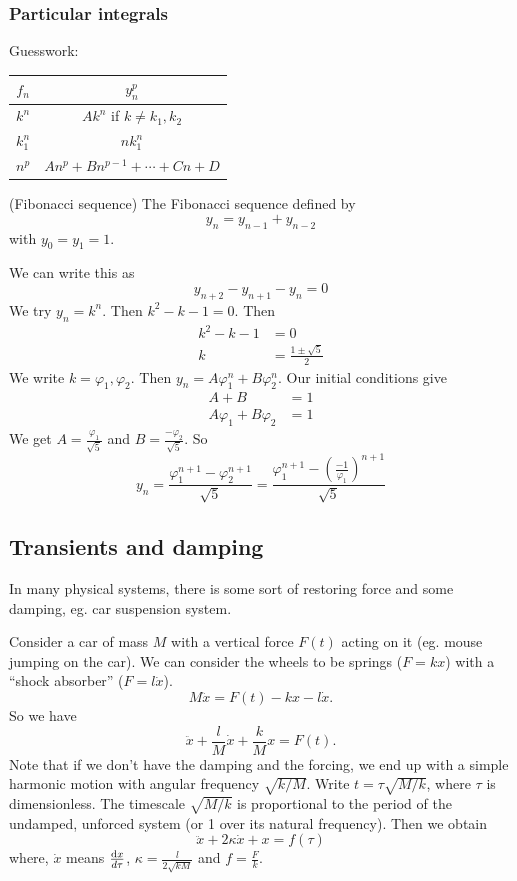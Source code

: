 \documentclass[a4paper]{article}
\begin{document}
  \subsubsection{Particular integrals}
  Guesswork:

  \vspace{4pt}
  \noindent\begin{tabular}{cc}
    \toprule
    $f_n$ & $y_n^p$\\
    \midrule
    $k^n$ & $Ak^n$ if $k \not= k_1, k_2$\\
    $k_1^n$ & $nk_1^n$\\
    $n^p$ & $An^p + Bn^{p - 1} + \cdots + Cn + D$\\
    \bottomrule
  \end{tabular}

  \begin{eg}
    (Fibonacci sequence) The Fibonacci sequence defined by
    \[
      y_n = y_{n - 1} + y_{n - 2}
    \]
    with $y_0 = y_1 = 1$.

    We can write this as
    \[
      y_{n + 2} - y_{n + 1} - y_n = 0
    \]
    We try $y_n = k^n$. Then $k^2 - k - 1 = 0$. Then
    \begin{align*}
      k^2 - k - 1 &= 0\\
      k &= \frac{1 \pm \sqrt{5}}{2}
    \end{align*}
    We write $k = \varphi_1, \varphi_2$. Then $y_n = A\varphi_1^n + B\varphi_2^n$. Our initial conditions give
    \begin{align*}
      A + B &= 1\\
      A\varphi_1 + B\varphi_2 &= 1
    \end{align*}
    We get $\displaystyle A = \frac{\varphi_1}{\sqrt{5}}$ and $\displaystyle B = \frac{-\varphi_2}{\sqrt{5}}$. So
    \[
      y_n = \frac{\varphi_1^{n + 1} - \varphi_2^{n + 1}}{\sqrt{5}} = \frac{\varphi_1^{n + 1} - \left(\frac{-1}{\varphi_1}\right)^{n + 1}}{\sqrt{5}}
    \]
  \end{eg}

  \subsection{Transients and damping}
  In many physical systems, there is some sort of restoring force and some damping, eg. car suspension system.

  Consider a car of mass $M$ with a vertical force $F(t)$ acting on it (eg. mouse jumping on the car). We can consider the wheels to be springs ($F = kx$) with a ``shock absorber'' ($F = l\dot x$).
  \[
    M\ddot x = F(t) - kx - l\dot x.
  \]
  So we have
  \[
    \ddot x + \frac{l}{M}\dot x + \frac{k}{M}x = F(t).
  \]
  Note that if we don't have the damping and the forcing, we end up with a simple harmonic motion with angular frequency $\sqrt{k/M}$. Write $t = \tau \sqrt{M/k}$, where $\tau$ is dimensionless. The timescale $\sqrt{M/k}$ is proportional to the period of the undamped, unforced system (or 1 over its natural frequency). Then we obtain
  \[
    \ddot x + 2\kappa\dot x + x = f(\tau)
  \]
  where, $\dot x$ means $\frac{\mathrm{d} x}{d\tau}$, $\kappa = \frac{l}{2\sqrt{kM}}$ and $f = \frac{F}{k}$.
\end{document}
